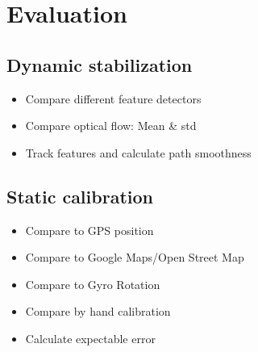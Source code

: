 \section{Evaluation}
\subsection{Dynamic stabilization}
\begin{itemize}
    \item Compare different feature detectors
    \item Compare optical flow: Mean \& std
    \item Track features and calculate path smoothness
\end{itemize}
\subsection{Static calibration}
\begin{itemize}
    \item Compare to GPS position
    \item Compare to Google Maps/Open Street Map
    \item Compare to Gyro Rotation
    \item Compare by hand calibration
    \item Calculate expectable error
\end{itemize}